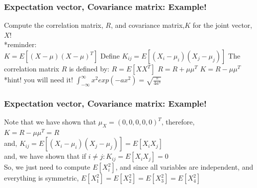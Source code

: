 \documentclass{beamer}
\begin{document}
\begin{frame}
\frametitle{Expectation vector, Covariance matrix: Example!}
Compute the correlation matrix, $R$, and covariance matrix,$K$ for the joint vector, $X$!\newline\\
*reminder:\newline\\
$K = E[(X-\mu)(X-\mu)^T]$\newline
Define\newline
$K_{ij}= E[(X_i-\mu_i)(X_j-\mu_j)]$\newline
The correlation matrix $R$ is defined by:\newline
$R=E[XX^T]$\newline
$R=R+\mu \mu^T$
$K=R-\mu\mu^T$\newline\\

*hint! you will need it!
$\int_{-\infty}^{\infty}x^2exp(-ax^2)=\sqrt{\frac{\pi}{4a^3}}$
\end{frame}

\begin{frame}
\frametitle{Expectation vector, Covariance matrix: Example!}
Note that we have shown that $\mu_X=(0,0,0,0,0)^T$, therefore,\newline\\
$K=R-\mu\mu^T = R$\newline\\
and, $K_{ij}= E[(X_i-\mu_i)(X_j-\mu_j)] = E[X_iX_j]$\newline\\
and, we have shown that if $i\neq j: K_{ij}=E[X_iX_j] =0$\newline\\
So, we just need to compute $E[X_i^2]$, and since all variables are independent, and everything is symmetric, $E[X_1^2]=E[X_2^2]=E[X_3^2]=E[X_4^2]$
\end{frame}
\end{document}
